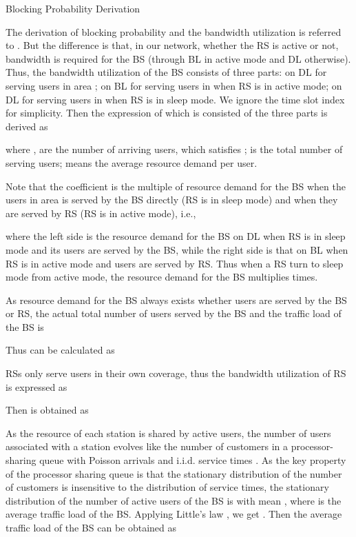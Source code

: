 \documentclass[conference]{IEEEtran}
\begin{document}
  \vspace{-0.1cm}
 \begin{appendix}
 \centerline{Blocking Probability Derivation}
 The derivation of blocking probability and the bandwidth utilization is referred to \cite{Jie2012Adynamic}. But the difference is that, in our network, whether the RS is active or not, bandwidth is required for the BS (through BL in active mode and DL otherwise). Thus, the bandwidth utilization of the BS consists of three parts: on DL for serving users in area ; on BL for serving users in  when RS is in active mode; on DL for serving users in  when RS is in sleep mode. We ignore the time slot index  for simplicity. Then the expression of  which is consisted of the three parts is derived as

 
 where ,  are the number of arriving users, which satisfies  \cite{Jie2012Adynamic};  is the total number of serving users;  means the average resource demand per user.

 Note that the coefficient  is the multiple of resource demand for the BS when the users in area  is served by the BS directly (RS is in sleep mode) and when they are served by RS (RS is in active mode), i.e.,
 
 where the left side is the resource demand for the BS on DL when RS is in sleep mode and its users are served by the BS, while the right side is that on BL when RS is in active mode and users are served by RS. Thus when a RS turn to sleep mode from active mode, the resource demand for the BS multiplies  times.

 As resource demand for the BS always exists whether users are served by the BS or RS, the actual total number of users served by the BS and the traffic load of the BS is
 
 

 Thus  can be calculated as
 

 RSs only serve users in their own coverage, thus the bandwidth utilization of RS is expressed as
 

 Then  is obtained as
 

 As the resource of each station is shared by active users, the number of users associated with a station evolves like the number of customers in a processor-sharing queue with Poisson arrivals and i.i.d. service times \cite{bonald2003wireless}. As the key property of the processor sharing queue is that the stationary distribution of the number of customers is insensitive to the distribution of service times, the stationary distribution of the number of active users of the BS is  with mean , where  is the average traffic load of the BS. Applying Little's law \cite{kleinrock1975queueing}, we get . Then the average traffic load of the BS  can be obtained as
 


\end{appendix}
\end{document}

